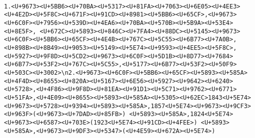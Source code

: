\documentclass[
]{article}
\begin{document}
\begin{verbatim}
                                                                                                                                                                                                                                                                                                                                                                                                                                                                                                                                                                                                                                                                                                                                                                                                                                                                                                                                                                                                                                                                                                                                                                                                                                                                                                                                                                                                                                                                                                                                                                                                                                                                                                                                                                                                                                                                                                                                                                                                                                                                                                                                                                                                                                                                            1.<U+9673><U+5BB6><U+70BA><U+5317><U+81FA><U+7063><U+6E05><U+4EE3><U+4E2D><U+5F8C><U+671F><U+91CD><U+8981><U+5BB6><U+65CF>,<U+9673><U+6C0F><U+7956><U+539D><U+4EA6><U+70BA><U+570B><U+5B9A><U+53E4><U+8E5F>, <U+672C><U+5893><U+846C><U+7FA4><U+88DC><U+5145><U+9673><U+6C0F><U+5BB6><U+65CF><U+4E4B><U+767C><U+5C55><U+6B77><U+7A0B>,<U+898B><U+8B49><U+9053><U+5149><U+5E74><U+9593><U+4EE5><U+5F8C>,<U+5927><U+9F8D><U+5CD2><U+9673><U+6C0F><U+5D1B><U+8D77><U+7684><U+6B77><U+53F2><U+767C><U+5C55>,<U+5177><U+6B77><U+53F2><U+50F9><U+503C><U+3002>\n2.<U+9673><U+6C0F><U+5BB6><U+65CF><U+5893><U+585A><U+4F4D><U+8655><U+820A><U+5167><U+6E56><U+5927><U+9642><U+6240><U+5728>,<U+4F86><U+9F8D><U+81EA><U+91D1><U+5C71><U+9762><U+6771><U+51FA>,<U+4E09><U+8655><U+5893><U+585A><U+5305><U+62EC>1843<U+5E74><U+9673><U+5728><U+9394><U+5893><U+585A>,1857<U+5E74><U+9673><U+9CF3><U+963F>(<U+9673><U+7DAD><U+85FB>) <U+5893><U+585A>,1824<U+5E74><U+9673><U+6587><U+703E>(1923<U+5E74><U+91CD><U+4FEE>) <U+5893><U+585A>,<U+9673><U+9DF3><U+5347>(<U+4E59><U+672A><U+5E74>) 
\end{verbatim}
\end{document}
